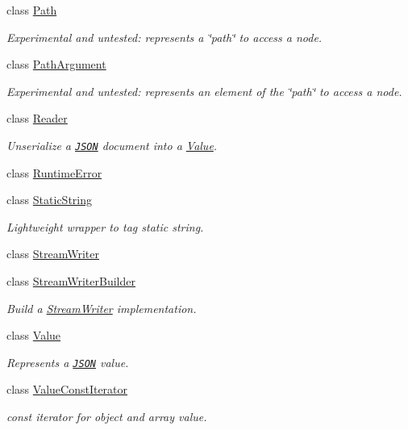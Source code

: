 \begin{DoxyCompactItemize}
class \hyperlink{classJson_1_1Path}{Path}
\begin{DoxyCompactList}\small\item\em Experimental and untested\+: represents a \char`\"{}path\char`\"{} to access a node. \end{DoxyCompactList}\item 
class \hyperlink{classJson_1_1PathArgument}{Path\+Argument}
\begin{DoxyCompactList}\small\item\em Experimental and untested\+: represents an element of the \char`\"{}path\char`\"{} to access a node. \end{DoxyCompactList}\item 
class \hyperlink{classJson_1_1Reader}{Reader}
\begin{DoxyCompactList}\small\item\em Unserialize a \href{http://www.json.org}{\tt J\+S\+ON} document into a \hyperlink{classJson_1_1Value}{Value}. \end{DoxyCompactList}\item 
class \hyperlink{classJson_1_1RuntimeError}{Runtime\+Error}
\item 
class \hyperlink{classJson_1_1StaticString}{Static\+String}
\begin{DoxyCompactList}\small\item\em Lightweight wrapper to tag static string. \end{DoxyCompactList}\item 
class \hyperlink{classJson_1_1StreamWriter}{Stream\+Writer}
\item 
class \hyperlink{classJson_1_1StreamWriterBuilder}{Stream\+Writer\+Builder}
\begin{DoxyCompactList}\small\item\em Build a \hyperlink{classJson_1_1StreamWriter}{Stream\+Writer} implementation. \end{DoxyCompactList}\item 
class \hyperlink{classJson_1_1Value}{Value}
\begin{DoxyCompactList}\small\item\em Represents a \href{http://www.json.org}{\tt J\+S\+ON} value. \end{DoxyCompactList}\item 
class \hyperlink{classJson_1_1ValueConstIterator}{Value\+Const\+Iterator}
\begin{DoxyCompactList}\small\item\em const iterator for object and array value. \end{DoxyCompactList}\item 

\end{DoxyCompactItemize}
